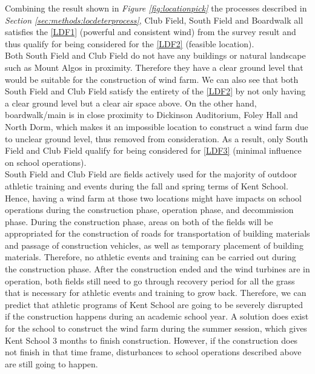 \documentclass[review]{elsarticle}
\begin{document}
Combining the result shown in \textit{Figure \ref{fig:locationpick}} the processes described in \textit{Section \ref{sec:methods:locdeterprocess}}, 
Club Field, South Field and Boardwalk all satisfies the \ref{LDF1} (powerful and consistent wind) from the survey 
result and thus qualify for being considered for the \ref{LDF2} (feasible location).  %
\\\indent Both South Field and Club Field do not have any buildings or natural landscape such as Mount Algos in proximity. Therefore 
they have a clear ground level that would be suitable for the construction of wind farm. We can also see that both South Field and Club 
Field satisfy the entirety of the \ref{LDF2} by not only having a clear ground level but a clear air space above. 
On the other hand, boardwalk/main is in close proximity to Dickinson Auditorium, Foley Hall and North Dorm, which makes it an impossible 
location to construct a wind farm due to unclear ground level, thus removed from consideration. As a result, only South Field and Club 
Field qualify for being considered for \ref{LDF3} (minimal influence on school operations).
\\\indent South Field and Club Field are fields actively used for the majority of outdoor athletic training and events during the fall 
and spring terms of Kent School. Hence, having a wind farm at those two locations might have impacts on school operations during the 
construction phase, operation phase, and decommission phase. During the construction phase, areas on both of the fields will be appropriated 
for the construction of roads for transportation of building materials and passage of construction vehicles, as well as temporary placement 
of building materials. Therefore, no athletic events and training can be carried out during the construction phase. After the construction 
ended and the wind turbines are in operation, both fields still need to go through recovery period for all the grass that is necessary for 
athletic events and training to grow back. Therefore, we can predict that athletic programs of Kent School are going to be severely disrupted 
if the construction happens during an academic school year. A solution does exist for the school to construct the wind farm during the summer 
session, which gives Kent School 3 months to finish construction. However, if the construction does not finish in that time frame, disturbances 
to school operations described above are still going to happen. %
\end{document}
